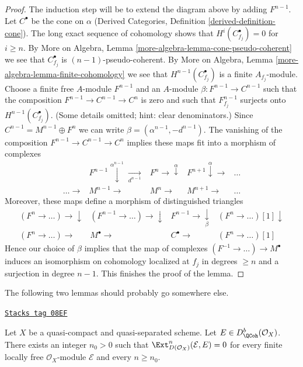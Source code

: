 \begin{proof}
\medskip\noindent
The induction step will be to extend the diagram
above by adding $F^{n - 1}$. Let $C^\bullet$ be the cone on $\alpha$
(Derived Categories, Definition \ref{derived-definition-cone}).
The long exact sequence of cohomology shows that
$H^i(C^\bullet_{f_j}) = 0$ for $i \geq n$. By
More on Algebra, Lemma \ref{more-algebra-lemma-cone-pseudo-coherent}
we see that $C^\bullet_{f_j}$ is $(n - 1)$-pseudo-coherent. By
More on Algebra, Lemma \ref{more-algebra-lemma-finite-cohomology}
we see that $H^{n - 1}(C^\bullet_{f_j})$ is a finite $A_{f_j}$-module.
Choose a finite free $A$-module $F^{n - 1}$ and an $A$-module
$\beta : F^{n - 1} \to C^{n - 1}$ such that the composition
$F^{n - 1} \to C^{n - 1} \to C^n$ is zero and such that
$F^{n - 1}_{f_j}$ surjects onto $H^{n - 1}(C^\bullet_{f_j})$.
(Some details omitted; hint: clear denominators.)
Since $C^{n - 1} = M^{n - 1} \oplus F^n$
we can write $\beta = (\alpha^{n - 1}, -d^{n - 1})$. The vanishing of the
composition $F^{n - 1} \to C^{n - 1} \to C^n$ implies
these maps fit into a morphism of complexes
$$
\begin{array}{ccccc} & F^{n - 1} \overset{\alpha^{n - 1}}{\downarrow}\underset{d^{n - 1}}{\longrightarrow} & F^n \longrightarrow\overset{\alpha}{\downarrow} & F^{n + 1} \overset{\alpha}{\downarrow}\longrightarrow & \ldots \\ \ldots \longrightarrow & M^{n - 1} \longrightarrow & M^n \longrightarrow & M^{n + 1} \longrightarrow & \ldots\end{array}
$$
Moreover, these maps define a morphism of distinguished triangles
$$
\begin{array}{cccc}(F^n \to \ldots) \longrightarrow\downarrow & (F^{n-1} \to \ldots) \longrightarrow\downarrow & F^{n-1} \longrightarrow\underset{\beta}{\downarrow} & (F^n \to \ldots)[1] \downarrow \\ (F^n \to \ldots) \longrightarrow & M^\bullet \longrightarrow & C^\bullet \longrightarrow & (F^n \to \ldots)[1]\end{array}
$$
Hence our choice of $\beta$ implies that the map of complexes
$(F^{-1} \to \ldots) \to M^\bullet$ induces an isomorphism on
cohomology localized at $f_j$ in degrees $\geq n$ and a surjection
in degree $n - 1$. This finishes the proof of the lemma.
\end{proof}

The following two lemmas should probably go somewhere else.

\begin{lemma}
\label{perfect-lemma-vanishing-ext}
\href{https://stacks.math.columbia.edu/tag/08EF}{\texttt{Stacks tag 08EF}}

Let $X$ be a quasi-compact and quasi-separated scheme.
Let $E \in D^b_\QCoh(\mathcal{O}_X)$.
There exists an integer $n_0 > 0$ such that
$\Ext^n_{D(\mathcal{O}_X)}(\mathcal{E}, E) = 0$
for every finite locally free
$\mathcal{O}_X$-module $\mathcal{E}$ and every $n \geq n_0$.
\end{lemma}

